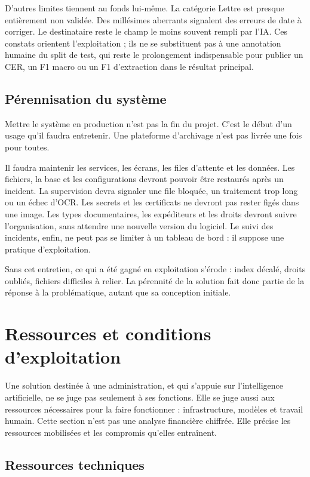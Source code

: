 D'autres limites tiennent au fonds lui-même. La catégorie \og Lettre\fg{} est presque entièrement non validée. Des millésimes aberrants signalent des erreurs de date à corriger. Le destinataire reste le champ le moins souvent rempli par l'IA. Ces constats orientent l'exploitation ; ils ne se substituent pas à une annotation humaine du split de test, qui reste le prolongement indispensable pour publier un CER, un F1 macro ou un F1 d'extraction dans le résultat principal.

\subsection{Pérennisation du système}

Mettre le système en production n'est pas la fin du projet. C'est le début d'un usage qu'il faudra entretenir. Une plateforme d'archivage n'est pas livrée une fois pour toutes.

Il faudra maintenir les services, les écrans, les files d'attente et les données. Les fichiers, la base et les configurations devront pouvoir être restaurés après un incident. La supervision devra signaler une file bloquée, un traitement trop long ou un échec d'OCR. Les secrets et les certificats ne devront pas rester figés dans une image. Les types documentaires, les expéditeurs et les droits devront suivre l'organisation, sans attendre une nouvelle version du logiciel. Le suivi des incidents, enfin, ne peut pas se limiter à un tableau de bord : il suppose une pratique d'exploitation.

Sans cet entretien, ce qui a été gagné en exploitation s'érode : index décalé, droits oubliés, fichiers difficiles à relier. La pérennité de la solution fait donc partie de la réponse à la problématique, autant que sa conception initiale.

\section{Ressources et conditions d'exploitation}

Une solution destinée à une administration, et qui s'appuie sur l'intelligence artificielle, ne se juge pas seulement à ses fonctions. Elle se juge aussi aux ressources nécessaires pour la faire fonctionner : infrastructure, modèles et travail humain. Cette section n'est pas une analyse financière chiffrée. Elle précise les ressources mobilisées et les compromis qu'elles entraînent.

\subsection{Ressources techniques}

